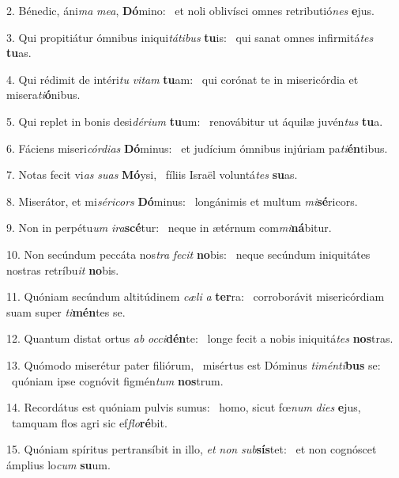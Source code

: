 2. Bénedic, áni\textit{ma} \textit{me}\textit{a}, \textbf{Dó}mino: \ast\  et noli oblivísci omnes retributió\textit{nes} \textbf{e}jus.\

3. Qui propitiátur ómnibus iniqui\textit{tá}\textit{ti}\textit{bus} \textbf{tu}is: \ast\  qui sanat omnes infirmitá\textit{tes} \textbf{tu}as.\

4. Qui rédimit de intéri\textit{tu} \textit{vi}\textit{tam} \textbf{tu}am: \ast\  qui corónat te in misericórdia et misera\textit{ti}\textbf{ó}nibus.\

5. Qui replet in bonis desi\textit{dé}\textit{ri}\textit{um} \textbf{tu}um: \ast\  renovábitur ut áquilæ juvén\textit{tus} \textbf{tu}a.\

6. Fáciens miseri\textit{cór}\textit{di}\textit{as} \textbf{Dó}minus: \ast\  et judícium ómnibus injúriam pa\textit{ti}\textbf{én}tibus.\

7. Notas fecit vi\textit{as} \textit{su}\textit{as} \textbf{Mó}ysi, \ast\  fíliis Israël voluntá\textit{tes} \textbf{su}as.\

8. Miserátor, et mi\textit{sé}\textit{ri}\textit{cors} \textbf{Dó}minus: \ast\  longánimis et multum \textit{mi}\textbf{sé}ricors.\

9. Non in perpétu\textit{um} \textit{i}\textit{ra}\textbf{scé}tur: \ast\  neque in ætérnum com\textit{mi}\textbf{ná}bitur.\

10. Non secúndum peccáta nos\textit{tra} \textit{fe}\textit{cit} \textbf{no}bis: \ast\  neque secúndum iniquitátes nostras retríbu\textit{it} \textbf{no}bis.\

11. Quóniam secúndum altitúdinem \textit{cæ}\textit{li} \textit{a} \textbf{ter}ra: \ast\  corroborávit misericórdiam suam super \textit{ti}\textbf{mén}tes se.\

12. Quantum distat ortus \textit{ab} \textit{oc}\textit{ci}\textbf{dén}te: \ast\  longe fecit a nobis iniquitá\textit{tes} \textbf{nos}tras.\

13. Quómodo miserétur pater filiórum, \dag\  misértus est Dóminus \textit{ti}\textit{mén}\textit{ti}\textbf{bus} se: \ast\  quóniam ipse cognóvit figmén\textit{tum} \textbf{nos}trum.\

14. Recordátus est quóniam pulvis sumus: \dag\  homo, sicut fœ\textit{num} \textit{di}\textit{es} \textbf{e}jus, \ast\  tamquam flos agri sic ef\textit{flo}\textbf{ré}bit.\

15. Quóniam spíritus pertransíbit in illo, \textit{et} \textit{non} \textit{sub}\textbf{sís}tet: \ast\  et non cognóscet ámplius lo\textit{cum} \textbf{su}um.\

